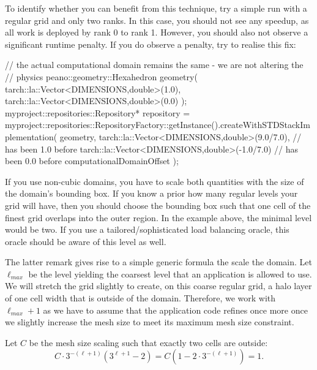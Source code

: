 To identify whether you can benefit from this technique, try a simple run with a
regular grid and only two ranks. 
In this case, you should not see any speedup, as all work is deployed by rank 0 to rank 1. 
However, you should also not observe a significant runtime penalty. 
If you do observe a penalty, try to realise this fix:


\begin{code}
// the actual computational domain remains the same - we are not altering the
// physics
peano::geometry::Hexahedron geometry(
  tarch::la::Vector<DIMENSIONS,double>(1.0),
  tarch::la::Vector<DIMENSIONS,double>(0.0) );
myproject::repositories::Repository* repository = 
  myproject::repositories::RepositoryFactory::getInstance().createWithSTDStackImplementation(
  geometry,
  tarch::la::Vector<DIMENSIONS,double>(9.0/7.0),   // has been 1.0 before
  tarch::la::Vector<DIMENSIONS,double>(-1.0/7.0)   // has been 0.0 before
  computationalDomainOffset );
\end{code}

\begin{remark}
If you use non-cubic domains, you have to scale both quantities with the size of
the domain's bounding box.
If you know a prior how many regular levels your grid will have, then you should
choose the bounding box such that one cell of the finest grid overlaps into the
outer region. 
In the example above, the minimal level would be two.
If you use a tailored/sophisticated load balancing oracle, this oracle should be
aware of this level as well.
\end{remark}

The latter remark gives rise to a simple generic formula the scale the
domain.
Let $\ell _{max}$ be the level yielding the coarsest level that an application
is allowed to use.
We will stretch the grid slightly to create, on this coarse regular grid, a
halo layer of one cell width that is outside of the domain.
Therefore, we work with $\ell _{max}+1$ as we have to assume that the
application code refines once more once we slightly increase the mesh size to
meet its maximum mesh size constraint.


Let $C$ be the mesh size scaling such that exactly two cells are outside:
\[
  C \cdot 3^{-(\ell +1)} \left( 3^{\ell +1} -2 \right) 
  = C \left( 1-2 \cdot 3^{-(\ell +1)} \right)
  = 1.
\]

